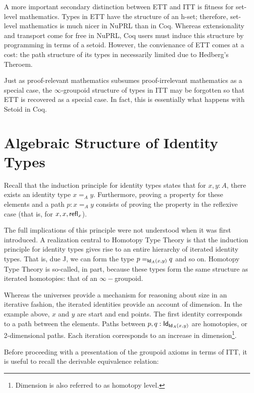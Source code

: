 \documentclass[12pt]{article}
\begin{document}
A more important secondary distinction between ETT and ITT is fitness for set-
level mathematics.  Types in ETT have the structure of an h-set; 
therefore, set-level mathematics is much nicer in NuPRL than in Coq. Whereas extensionality
and transport come for free in NuPRL, Coq users must induce this structure by
programming in terms of a setoid.  However, the convienance of ETT comes at a cost: 
the path structure of its types in necessarily limited due to Hedberg's Theroem.

Just as proof-relevant mathematics subsumes proof-irrelevant mathematics as a 
special case, the $\infty$-groupoid structure of types in ITT may be
forgotten so that ETT is recovered as a special case.  In fact, this is 
essentially what happens with Setoid in Coq.

\section{Algebraic Structure of Identity Types}\label{sec:structure}

Recall that the induction principle for identity types states that for
$x,y :A $, there exists an identity type $x =_A y$.  Furthermore, proving a
property for these elements and a path $p : x = _A y$ consists of proving the
property in the reflexive case (that is, for $x, x, \mathsf{refl}_{x}$).

The full implications of this principle were not understood when it was 
first introduced.  A realization central to Homotopy Type Theory
is that the induction principle for identity types
gives rise to an entire hierarchy of iterated identity types.
That is, due J, we can form the type $p =_{\mathsf{Id}_{A}(x,y)} q$ and so on.
Homotopy Type Theory is so-called, in part, because these types form the
same structure as iterated homotopies: that of an $\infty-$groupoid.

Whereas the universes provide a mechanism for reasoning about size in an
iterative fashion, the iterated identities provide an account of dimension.
In the example above, $x$ and $y$ are start and end points.  The first identity 
corresponds to a path between the elements.  Paths between $p,q : \mathsf{Id}_{\mathsf{Id}_{A}(x,y)}$
are homotopies, or 2-dimensional paths.  Each iteration corresponds to an increase
in dimension\footnote{Dimension is also referred to as homotopy level.}.

Before proceeding with a presentation of the groupoid axioms in terms of 
ITT, it is useful to recall the derivable equivalence relation:
\end{document}
